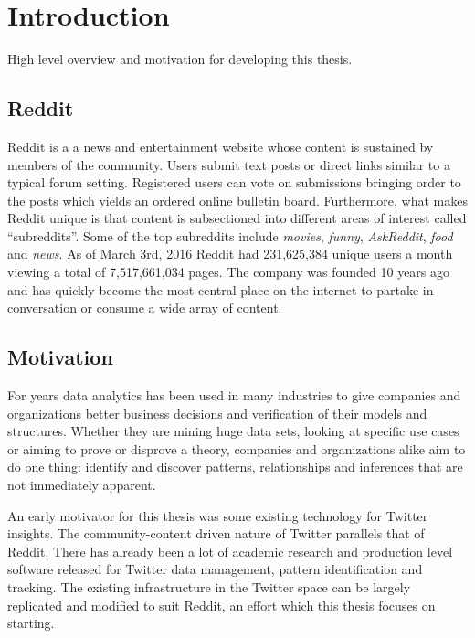 \documentclass[msc,oneside]{ubcthesis}%
\begin{document}

\mainmatter\setlength{\parskip}{1em}


\chapter{Introduction}
High level overview and motivation for developing this thesis.

\section{Reddit}
Reddit is a a news and entertainment website whose content is sustained by members of the community. Users submit text posts or direct links similar to a typical forum setting. Registered users can vote on submissions bringing order to the posts which yields an ordered online bulletin board. Furthermore, what makes Reddit unique is that content is subsectioned into different areas of interest called ``subreddits''. Some of the top subreddits include \textit{movies}, \textit{funny}, \textit{AskReddit}, \textit{food} and \textit{news}. As of March 3rd, 2016 Reddit had 231,625,384 unique users a month viewing a total of 7,517,661,034 pages. The company was founded 10 years ago and has quickly become the most central place on the internet to partake in conversation or consume a wide array of content.

\section{Motivation}
For years data analytics has been used in many industries to give companies and organizations better business decisions and verification of their models and structures. Whether they are mining huge data sets, looking at specific use cases or aiming to prove or disprove a theory, companies and organizations alike aim to do one thing: identify and discover patterns, relationships and inferences that are not immediately apparent.
\par
An early motivator for this thesis was some existing technology for Twitter insights. The community-content driven nature of Twitter parallels that of Reddit. There has already been a lot of academic research and production level software released for Twitter data management, pattern identification and tracking. The existing infrastructure in the Twitter space can be largely replicated and modified to suit Reddit, an effort which this thesis focuses on starting.
\end{document}
